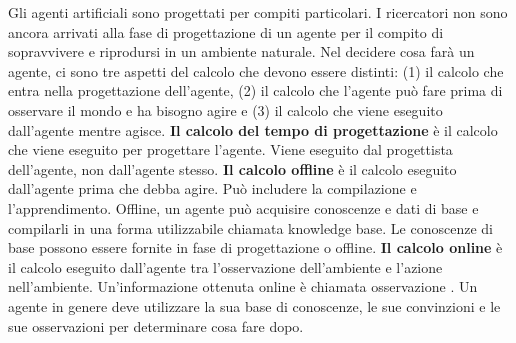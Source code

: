 \documentclass[a4paper]{extarticle}
\begin{document}
Gli agenti artificiali sono progettati per compiti particolari. I ricercatori non sono ancora arrivati alla fase di progettazione di un agente per il compito di sopravvivere e riprodursi in un ambiente naturale. Nel decidere cosa farà un agente, ci sono tre aspetti del calcolo che devono essere distinti: (1) il calcolo che entra nella progettazione dell'agente, (2) il calcolo che l'agente può fare prima di osservare il mondo e ha bisogno agire e (3) il calcolo che viene eseguito dall'agente mentre agisce. \textbf{Il calcolo del tempo di progettazione} è il calcolo che viene eseguito per progettare l'agente. Viene eseguito dal progettista dell'agente, non dall'agente stesso. \textbf{Il calcolo offline} è il calcolo eseguito dall'agente prima che debba agire. Può includere la compilazione e l'apprendimento. Offline, un agente può acquisire conoscenze e dati di base e compilarli in una forma utilizzabile chiamata knowledge base. Le conoscenze di base possono essere fornite in fase di progettazione o offline. \textbf{Il calcolo online} è il calcolo eseguito dall'agente tra l'osservazione dell'ambiente e l'azione nell'ambiente. Un'informazione ottenuta online è chiamata osservazione . Un agente in genere deve utilizzare la sua base di conoscenze, le sue convinzioni e le sue osservazioni per determinare cosa fare dopo.
\end{document}
